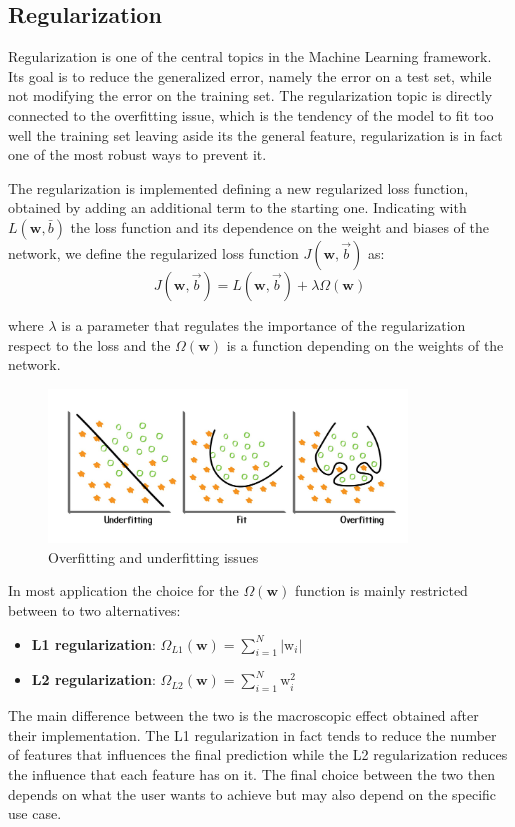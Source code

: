 \documentclass[../../main.tex]{subfiles}
\begin{document}
\subsection{Regularization}\label{regularization}

Regularization is one of the central topics in the Machine Learning framework. Its goal is to reduce the generalized error, namely the error on a test set, while not modifying the error on the training set. The regularization topic is directly connected to the overfitting issue, which is the tendency of the model to fit too well the training set leaving aside its the general feature, regularization is in fact one of the most robust ways to prevent it.

The regularization is implemented defining a new regularized loss function, obtained by adding an additional term to the starting one. Indicating with $L(\boldsymbol{w},\bar{b})$ the loss function and its dependence on the weight and biases of the network, we define the regularized loss function $J(\mathbf{w}, \vec{b})$ as:
\begin{equation}
J(\mathbf{w}, \vec{b})=L(\mathbf{w}, \vec{b})+ \lambda\Omega(\mathbf{w})
\end{equation}

where $\lambda$ is a parameter that regulates the importance of the regularization respect to the loss and the $\Omega(\mathbf{w})$ is a function depending on the weights of the network. 


\begin{figure}[h]
    \centering
\includegraphics[width=0.85\textwidth]{sections/03/Images/ML_issues.jpg}
\caption{Overfitting and underfitting issues}
    \label{fig:overfitting}
\end{figure}

In most application the choice for the $\Omega(\mathbf{w})$ function is mainly restricted between to two alternatives:
\begin{itemize}
    \item \textbf{L1 regularization}: $\Omega_{L1}(\mathbf{w}) = \sum_{i=1}^N |\text{w}_i|$
    \item \textbf{L2 regularization}: $\Omega_{L2}(\mathbf{w}) = \sum_{i=1}^N \text{w}_i^2$
\end{itemize}

The main difference between the two is the macroscopic effect obtained after their implementation. The L1 regularization in fact tends to reduce the number of features that influences the final prediction while the L2 regularization reduces the influence that each feature has on it. The final choice between the two then depends on what the user wants to achieve but may also depend on the specific use case.
    
\end{document}
